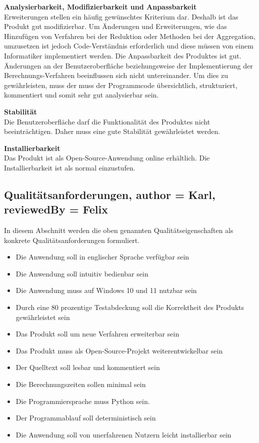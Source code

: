 \documentclass[parskip=full]{scrartcl} %
\begin{document}
\textbf{Analysierbarkeit, Modifizierbarkeit und Anpassbarkeit}\\
Erweiterungen stellen ein häufig gewünschtes Kriterium dar. Deshalb ist das Produkt gut modifizierbar. Um Änderungen und Erweiterungen, wie das Hinzufügen von Verfahren bei der Reduktion oder Methoden bei der Aggregation, umzusetzen ist jedoch Code-Verständnis erforderlich und diese müssen von einem Informatiker implementiert werden. Die Anpassbarkeit des Produktes ist gut. Änderungen an der Benutzeroberfläche beziehungsweise der Implementierung der Berechnungs-Verfahren beeinflussen sich nicht untereinander. Um dies zu gewährleisten, muss der muss der Programmcode übersichtlich, strukturiert, kommentiert und somit sehr gut analysierbar sein.

\textbf{Stabilität}\\
Die Benutzeroberfläche darf die Funktionalität des Produktes nicht beeinträchtigen. Daher muss eine gute Stabilität gewährleistet werden.

\textbf{Installierbarkeit}\\
Das Produkt ist als Open-Source-Anwendung online erhältlich. Die Installierbarkeit ist als normal einzustufen.


\newpage 


\subsection{Qualitätsanforderungen, author = Karl, reviewedBy = Felix}
In diesem Abschnitt werden die oben genannten Qualitätseigenschaften als konkrete Qualitätsanforderungen formuliert.

\begin{itemize}
    \item <Q1> Die Anwendung soll in englischer Sprache verfügbar sein
    \item <Q2> Die Anwendung soll intuitiv bedienbar sein
    \item <Q3> Die Anwendung muss auf Windows 10 und 11 nutzbar sein
    \item <Q4> Durch eine 80 prozentige Testabdeckung soll die Korrektheit des Produkts gewährleistet sein
    \item <Q5> Das Produkt soll um neue Verfahren erweiterbar sein
    \item <Q6> Das Produkt muss als Open-Source-Projekt weiterentwickelbar sein
    \item <Q7> Der Quelltext soll lesbar und kommentiert sein
    \item <Q8> Die Berechnungszeiten sollen minimal sein
    \item <Q9> Die Programmiersprache muss Python sein.
    \item <Q10> Der Programmablauf soll deterministisch sein
    \item <Q11> Die Anwendung soll von unerfahrenen Nutzern leicht installierbar sein
\end{itemize}
\end{document}
